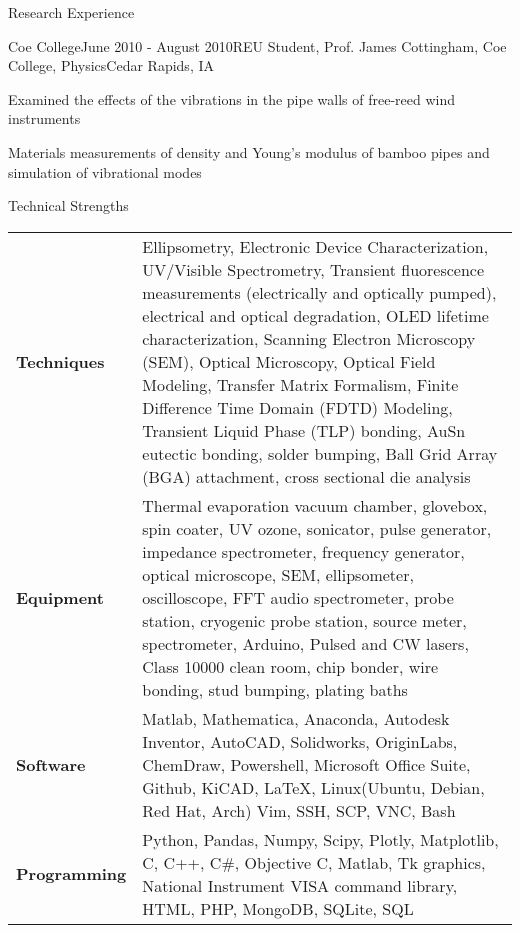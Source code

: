 \documentclass{resume} %
\begin{document}
\begin{rSection}{Research Experience}

\begin{samepage}
\begin{rSubsection}{Coe College}{June 2010 - August 2010}{REU Student, Prof. James Cottingham, Coe College, Physics}{Cedar Rapids, IA}
\item Examined the effects of the vibrations in the pipe walls of free-reed wind instruments
\item Materials measurements of density and Young's modulus of bamboo pipes and simulation of vibrational modes
\end{rSubsection}
\end{samepage}

\end{rSection}

\begin{rSection}{Technical Strengths}

\begin{tabular}{ @{} >{\hspace{-0.5em}\bfseries}l @{\hspace{3ex}} p{14.25cm} }
Techniques & Ellipsometry, Electronic Device Characterization, UV/Visible Spectrometry, Transient fluorescence measurements (electrically and optically pumped), electrical and optical degradation, OLED lifetime characterization, Scanning Electron Microscopy (SEM), Optical Microscopy, Optical Field Modeling, Transfer Matrix Formalism, Finite Difference Time Domain (FDTD) Modeling, Transient Liquid Phase (TLP) bonding, AuSn eutectic bonding, solder bumping, Ball Grid Array (BGA) attachment, cross sectional die analysis \\
Equipment & Thermal evaporation vacuum chamber, glovebox, spin coater, UV ozone, sonicator, pulse generator, impedance spectrometer, frequency generator, optical microscope, SEM, ellipsometer, oscilloscope, FFT audio spectrometer, probe station, cryogenic probe station, source meter, spectrometer, Arduino, Pulsed and CW lasers, Class 10000 clean room, chip bonder, wire bonding, stud bumping, plating baths \\
Software & Matlab, Mathematica, Anaconda, Autodesk Inventor, AutoCAD, Solidworks, OriginLabs, ChemDraw, Powershell, Microsoft Office Suite, Github, KiCAD, \LaTeX , Linux(Ubuntu, Debian, Red Hat, Arch) Vim, SSH, SCP, VNC, Bash \\
Programming & Python, Pandas, Numpy, Scipy, Plotly, Matplotlib, C, C++, C\#, Objective C, Matlab, Tk graphics, National Instrument VISA command library, HTML, PHP, MongoDB, SQLite, SQL  \\
\end{tabular}

\end{rSection}
\end{document}
